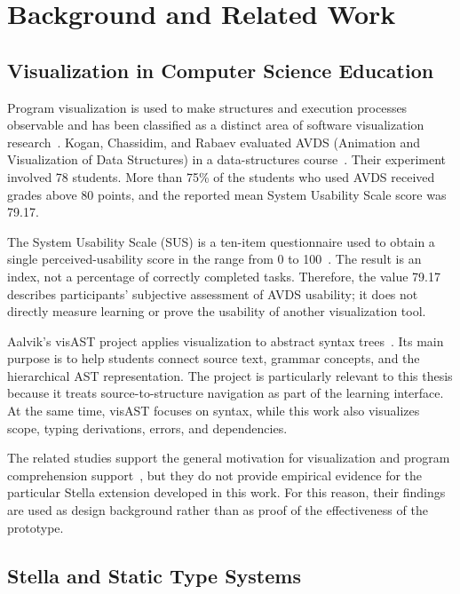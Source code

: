 ﻿\chapter{Background and Related Work}
\label{chap:background}

\section{Visualization in Computer Science Education}

Program visualization is used to make structures and execution processes observable and has been classified as a distinct area of software visualization research~\cite{Price1993Taxonomy,Sorva2013Review}. Kogan, Chassidim, and Rabaev evaluated AVDS (Animation and Visualization of Data Structures) in a data-structures course~\cite{EducationalTechnologyResearch}. Their experiment involved 78 students. More than 75\% of the students who used AVDS received grades above 80 points, and the reported mean System Usability Scale score was 79.17.

The System Usability Scale (SUS) is a ten-item questionnaire used to obtain a single perceived-usability score in the range from 0 to 100~\cite{Brooke1996SUS,Bangor2009SUS,ISO924111}. The result is an index, not a percentage of correctly completed tasks. Therefore, the value 79.17 describes participants' subjective assessment of AVDS usability; it does not directly measure learning or prove the usability of another visualization tool.

Aalvik's visAST project applies visualization to abstract syntax trees~\cite{VisAST}. Its main purpose is to help students connect source text, grammar concepts, and the hierarchical AST representation. The project is particularly relevant to this thesis because it treats source-to-structure navigation as part of the learning interface. At the same time, visAST focuses on syntax, while this work also visualizes scope, typing derivations, errors, and dependencies.

The related studies support the general motivation for visualization and program comprehension support~\cite{Sorva2013NotionalMachines,Storey2005ProgramComprehension}, but they do not provide empirical evidence for the particular Stella extension developed in this work. For this reason, their findings are used as design background rather than as proof of the effectiveness of the prototype.

\section{Stella and Static Type Systems}

